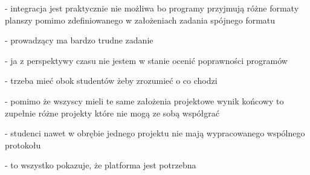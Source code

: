 - integracja jest praktycznie nie możliwa bo programy przyjmują różne formaty planszy pomimo zdefiniowanego w założeniach zadania spójnego formatu

- prowadzący ma bardzo trudne zadanie

- ja z perspektywy czasu nie jestem w stanie ocenić poprawności programów

- trzeba mieć obok studentów żeby zrozumieć o co chodzi

- pomimo że wszyscy mieli te same założenia projektowe wynik końcowy to zupełnie różne projekty które nie mogą ze sobą współgrać

- studenci nawet w obrębie jednego projektu nie mają wypracowanego wspólnego protokołu

- to wszystko pokazuje, że platforma jest potrzebna



